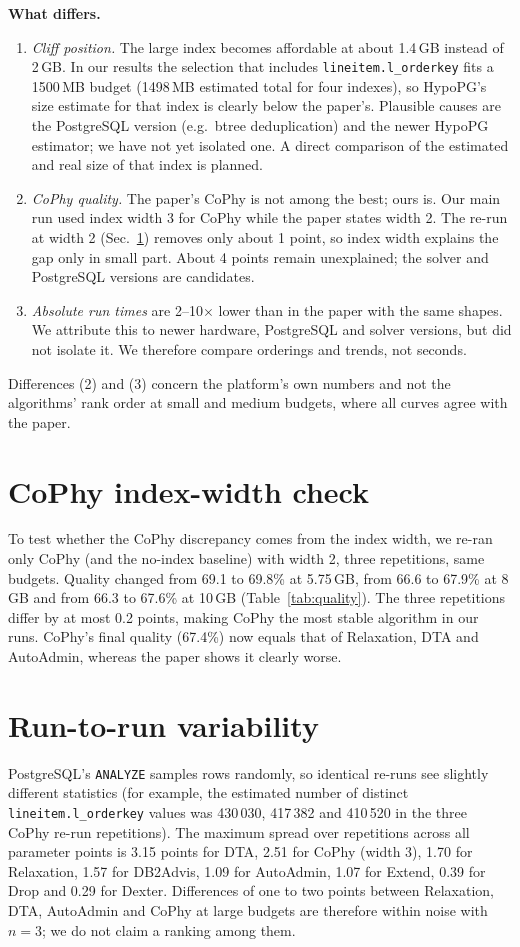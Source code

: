 \documentclass[11pt,a4paper]{article}
\begin{document}
\textbf{What differs.}
\begin{enumerate}
\item \emph{Cliff position.} The large index becomes affordable at about 1.4\,GB instead of 2\,GB. In our results the selection that includes \texttt{lineitem.l\_orderkey} fits a 1500\,MB budget (1498\,MB estimated total for four indexes), so HypoPG's size estimate for that index is clearly below the paper's. Plausible causes are the PostgreSQL version (e.g.\ btree deduplication) and the newer HypoPG estimator; we have not yet isolated one. A direct comparison of the estimated and real size of that index is planned.
\item \emph{CoPhy quality.} The paper's CoPhy is not among the best; ours is. Our main run used index width 3 for CoPhy while the paper states width 2. The re-run at width 2 (Sec.~\ref{sec:cophy}) removes only about 1 point, so index width explains the gap only in small part. About 4 points remain unexplained; the solver and PostgreSQL versions are candidates.
\item \emph{Absolute run times} are 2--10$\times$ lower than in the paper with the same shapes. We attribute this to newer hardware, PostgreSQL and solver versions, but did not isolate it. We therefore compare orderings and trends, not seconds.
\end{enumerate}
Differences (2) and (3) concern the platform's own numbers and not the algorithms' rank order at small and medium budgets, where all curves agree with the paper.

\section{CoPhy index-width check}\label{sec:cophy}
To test whether the CoPhy discrepancy comes from the index width, we re-ran only CoPhy (and the no-index baseline) with width 2, three repetitions, same budgets. Quality changed from 69.1 to 69.8\% at 5.75\,GB, from 66.6 to 67.9\% at 8\,GB and from 66.3 to 67.6\% at 10\,GB (Table~\ref{tab:quality}). The three repetitions differ by at most 0.2 points, making CoPhy the most stable algorithm in our runs. CoPhy's final quality (67.4\%) now equals that of Relaxation, DTA and AutoAdmin, whereas the paper shows it clearly worse.

\section{Run-to-run variability}
PostgreSQL's \texttt{ANALYZE} samples rows randomly, so identical re-runs see slightly different statistics (for example, the estimated number of distinct \texttt{lineitem.l\_orderkey} values was 430\,030, 417\,382 and 410\,520 in the three CoPhy re-run repetitions). The maximum spread over repetitions across all parameter points is 3.15 points for DTA, 2.51 for CoPhy (width 3), 1.70 for Relaxation, 1.57 for DB2Advis, 1.09 for AutoAdmin, 1.07 for Extend, 0.39 for Drop and 0.29 for Dexter. Differences of one to two points between Relaxation, DTA, AutoAdmin and CoPhy at large budgets are therefore within noise with $n=3$; we do not claim a ranking among them.
\end{document}
